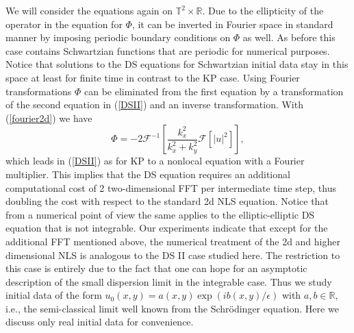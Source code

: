 \documentclass[final]{siamltex}
\begin{document}
We will consider the equations again on  
$\mathbb{T}^{2}\times \mathbb{R}$. Due to the ellipticity of the 
operator in the equation for $\Phi$, it can be inverted in Fourier 
space in standard manner by imposing periodic boundary conditions on 
$\Phi$ as well. As before this case contains Schwartzian functions 
that are periodic for numerical purposes. Notice that solutions to 
the DS equations for Schwartzian initial data stay in this space at 
least for finite time in contrast to the KP case. Using Fourier 
transformations  $\Phi$ can be eliminated from the 
first equation by a transformation of the second equation in 
(\ref{DSII}) and an inverse transformation. With (\ref{fourier2d}) we have 
$$\Phi=-2\mathcal{F}^{-1}\left[\frac{k_{x}^{2}}{k_{x}^{2}+k_{y}^{2}}\mathcal{F}\left[|u|^{2}\right]\right],$$
which leads in (\ref{DSII}) as for KP to a nonlocal equation with a  Fourier 
multiplier. 
This implies that the DS 
equation requires an additional computational cost of 2 two-dimensional 
FFT per intermediate time step, thus doubling the cost with respect to the 
standard 2d NLS equation. Notice that from a numerical point of view 
the same applies to the elliptic-elliptic DS equation that is not 
integrable. Our experiments indicate that except for the additional 
FFT mentioned above, the numerical treatment of the 2d and higher 
dimensional NLS is analogous to the DS II  case studied here. The 
restriction to this case is entirely due to the fact that one can 
hope for an asymptotic description of the small dispersion limit in 
the integrable case. Thus we study initial data of the form 
$u_{0}(x,y)=a(x,y)\exp(ib(x,y)/\epsilon)$ with $a,b\in\mathbb{R}$, 
i.e., the semi-classical limit well known from the Schr\"odinger 
equation. Here we discuss only real initial data for convenience. 
\end{document}
